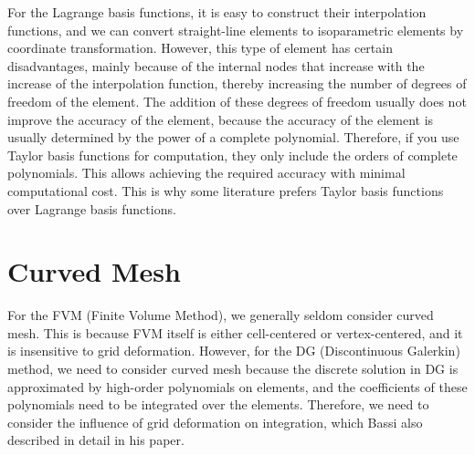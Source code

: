 \documentclass{develop-note}
\begin{document}

For the Lagrange basis functions, it is easy to construct their interpolation functions, and we can convert straight-line elements to isoparametric elements by coordinate transformation. However, this type of element has certain disadvantages, mainly because of the internal nodes that increase with the increase of the interpolation function, thereby increasing the number of degrees of freedom of the element. The addition of these degrees of freedom usually does not improve the accuracy of the element, because the accuracy of the element is usually determined by the power of a complete polynomial. Therefore, if you use Taylor basis functions for computation, they only include the orders of complete polynomials. This allows achieving the required accuracy with minimal computational cost. This is why some literature prefers Taylor basis functions over Lagrange basis functions.

\section{Curved Mesh}

For the FVM (Finite Volume Method), we generally seldom consider curved mesh. This is because FVM itself is either cell-centered or vertex-centered, and it is insensitive to grid deformation. However, for the DG (Discontinuous Galerkin) method, we need to consider curved mesh because the discrete solution in DG is approximated by high-order polynomials on elements, and the coefficients of these polynomials need to be integrated over the elements. Therefore, we need to consider the influence of grid deformation on integration, which Bassi also described in detail in his paper\cite{bassiHighOrderAccurateDiscontinuous1997}.
\end{document}
